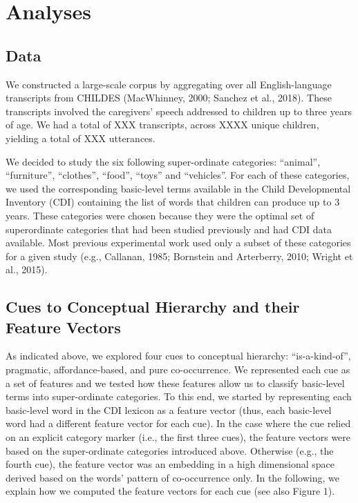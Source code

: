 \documentclass[10pt, letterpaper]{article}
\begin{document}
\hypertarget{analyses}{%
\section{Analyses}\label{analyses}}

\hypertarget{data}{%
\subsection{Data}\label{data}}

We constructed a large-scale corpus by aggregating over all
English-language transcripts from CHILDES (MacWhinney, 2000; Sanchez et
al., 2018). These transcripts involved the caregivers' speech addressed
to children up to three years of age. We had a total of XXX transcripts,
across XXXX unique children, yielding a total of XXX utterances.

We decided to study the six following super-ordinate categories:
``animal'', ``furniture'', ``clothes'', ``food'', ``toys'' and
``vehicles''. For each of these categories, we used the corresponding
basic-level terms available in the Child Developmental Inventory (CDI)
containing the list of words that children can produce up to 3 years.
These categories were chosen because they were the optimal set of
superordinate categories that had been studied previously and had CDI
data available. Most previous experimental work used only a subset of
these categories for a given study (e.g., Callanan, 1985; Bornstein and
Arterberry, 2010; Wright et al., 2015).

\hypertarget{cues-to-conceptual-hierarchy-and-their-feature-vectors}{%
\subsection{Cues to Conceptual Hierarchy and their Feature
Vectors}\label{cues-to-conceptual-hierarchy-and-their-feature-vectors}}

As indicated above, we explored four cues to conceptual hierarchy:
``is-a-kind-of'', pragmatic, affordance-based, and pure co-occurrence.
We represented each cue as a set of features and we tested how these
features allow us to classify basic-level terms into super-ordinate
categories. To this end, we started by representing each basic-level
word in the CDI lexicon as a feature vector (thus, each basic-level word
had a different feature vector for each cue). In the case where the cue
relied on an explicit category marker (i.e., the first three cues), the
feature vectors were based on the super-ordinate categories introduced
above. Otherwise (e.g., the fourth cue), the feature vector was an
embedding in a high dimensional space derived based on the words'
pattern of co-occurrence only. In the following, we explain how we
computed the feature vectors for each cue (see also Figure 1).
\end{document}
